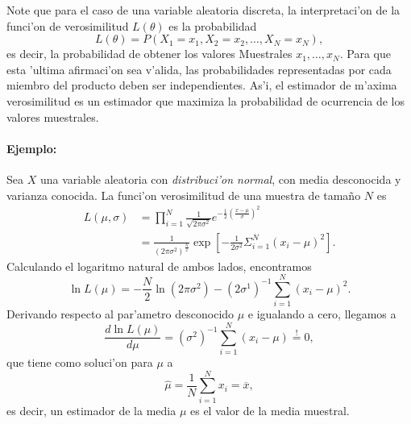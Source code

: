 \documentclass[a4paper]{report}
\begin{document}
Note que para el caso de una variable aleatoria discreta, la interpretaci'on de la funci'on de verosimilitud $L(\theta)$ es la probabilidad
\begin{equation}
L(\theta)=P(X_1=x_1, X_2=x_2,\dots, X_N=x_N),
\end{equation} 
es decir, la probabilidad de obtener los valores Muestrales $x_1,\dots,x_N$. Para que esta 'ultima afirmaci'on sea v'alida, las probabilidades representadas por cada miembro del producto deben ser independientes.
As'i, el estimador de m'axima verosimilitud es un estimador que maximiza la probabilidad de ocurrencia de los valores muestrales.

\paragraph{Ejemplo:} Sea $X$ una variable aleatoria con \textit{distribuci'on normal}, con media desconocida y varianza conocida. La funci'on verosimilitud de una muestra de tama\~no $N$ es
\begin{align}\label{Lmusigma}
L(\mu,\sigma)&= \prod_{i=1} ^N \frac{1}{\sqrt{2\pi\sigma^2}}e^{-\frac{1}{2}\left(\frac{x-\mu}{\sigma}\right)^2} \\
&= \frac{1}{(2\pi\sigma^2)^\frac{N}{2}}\exp\left[{-\frac{1}{2 \sigma^2 }\Sigma_{i=1} ^N ({x_i-\mu})^2}\right].
\end{align}
Calculando el logaritmo natural de ambos lados, encontramos
\begin{equation}\label{lnL}
\ln L(\mu)=-\frac{N}{2}\ln\left(2\pi\sigma^2\right)-(2\sigma^1)^{-1}\sum_{i=1}^N(x_i-\mu)^2.
\end{equation}
Derivando respecto al par'ametro desconocido $\mu$ e igualando a cero, llegamos a
\begin{equation}
\frac{d\ln L(\mu)}{d\mu}=(\sigma^2)^{-1} \sum_{i=1}^N(x_i-\mu)\stackrel{!}{=}0,
\end{equation}
que tiene como soluci'on para $\mu$ a
\begin{equation}
\hat{\mu}=\frac{1}{N}\sum_{i=1}^Nx_i=\overline{x},
\end{equation}
es decir, un estimador de la media $\mu$ es el valor de la media muestral.
\end{document}
